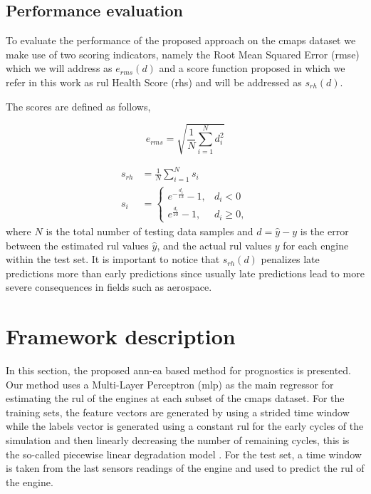 \documentclass{article}
\begin{document}
\subsection{Performance evaluation}
\label{sec:rul_metrics}

To evaluate the performance of the proposed approach on the \gls{cmaps} dataset we make use of two scoring indicators, namely the Root Mean Squared Error (\gls{rmse}) which we will address as $e_{rms}(d)$ and a score function proposed in \cite{Saxena2008} which we refer in this work as \gls{rul} Health Score (\gls{rhs}) and will be addressed as $s_{rh}(d)$. 

\pagebreak

The scores are defined as follows,

\begin{equation}
e_{rms} = \sqrt{ \frac{1}{N} \sum_{i=1}^{N}{d_i^2}}
\label{eq:rmse}
\end{equation}

\begin{align}
s_{rh} &= \frac{1}{N} \sum_{i=1}^{N}{s_i} \nonumber \\
s_i &= \begin{cases} 
      e^{-\frac{d_i}{13}} - 1, & d_i < 0 \\
      e^{\frac{d_i}{10}} - 1, & d_i \geq 0,
\end{cases}
\label{eq:rhs}
\end{align}
where $N$ is the total number of testing data samples and $d = \hat{y} - y$ is the error between the estimated \gls{rul} values $\hat{y}$, and the actual \gls{rul} values $y$ for each engine within the test set. It is important to notice that $s_{rh}(d)$ penalizes late predictions more than early predictions since usually late predictions lead to more severe consequences in fields such as aerospace.



\section{Framework description}
\label{sec:method}

In this section, the proposed \gls{ann}-\gls{ea} based method for prognostics is presented. Our method uses a Multi-Layer Perceptron (\gls{mlp}) as the main regressor for estimating the \gls{rul} of the engines at each subset of the \gls{cmaps} dataset. For the training sets, the feature vectors are generated by using a strided time window while the labels vector is generated using a constant \gls{rul} for the early cycles of the simulation and then linearly decreasing the number of remaining cycles, this is the so-called piecewise linear degradation model \cite{Ramasso2014}. For the test set, a time window is taken from the last sensors readings of the engine and used to predict the \gls{rul} of the engine.
\end{document}

